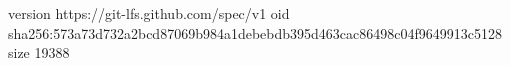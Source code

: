 version https://git-lfs.github.com/spec/v1
oid sha256:573a73d732a2bcd87069b984a1debebdb395d463cac86498c04f9649913c5128
size 19388
